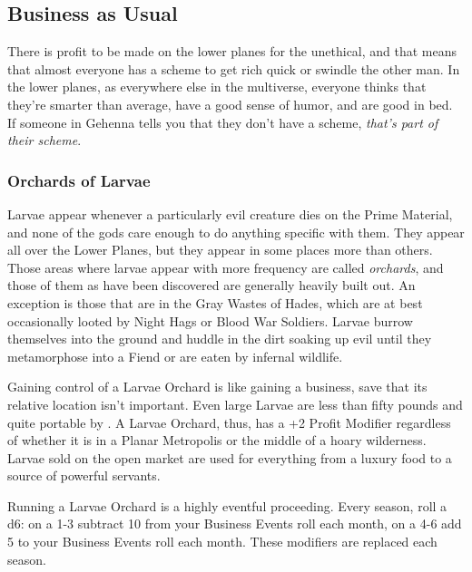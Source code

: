 

\subsection{Business as Usual}

There is profit to be made on the lower planes for the unethical, and that means that almost everyone has a scheme to get rich quick or swindle the other man. In the lower planes, as everywhere else in the multiverse, everyone thinks that they're smarter than average, have a good sense of humor, and are good in bed. If someone in Gehenna tells you that they don't have a scheme, \textit{that's part of their scheme}.

\subsubsection{Orchards of Larvae}

Larvae appear whenever a particularly evil creature dies on the Prime Material, and none of the gods care enough to do anything specific with them. They appear all over the Lower Planes, but they appear in some places more than others. Those areas where larvae appear with more frequency are called \textit{orchards}, and those of them as have been discovered are generally heavily built out. An exception is those that are in the Gray Wastes of Hades, which are at best occasionally looted by Night Hags or Blood War Soldiers. Larvae burrow themselves into the ground and huddle in the dirt soaking up evil until they metamorphose into a Fiend or are eaten by infernal wildlife.

Gaining control of a Larvae Orchard is like gaining a business, save that its relative location isn't important. Even large Larvae are less than fifty pounds and quite portable by . A Larvae Orchard, thus, has a +2 Profit Modifier regardless of whether it is in a Planar Metropolis or the middle of a hoary wilderness. Larvae sold on the open market are used for everything from a luxury food to a source of powerful servants.


Running a Larvae Orchard is a highly eventful proceeding. Every season, roll a d6: on a 1-3 subtract 10 from your Business Events roll each month, on a 4-6 add 5 to your Business Events roll each month. These modifiers are replaced each season.

